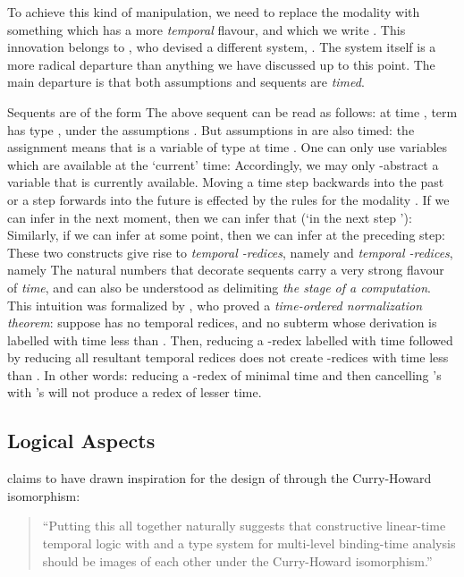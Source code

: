 \documentclass[a4paper]{amsart}
\begin{document}
To achieve this kind of manipulation, we need to replace the
 modality with something which has a more \emph{temporal}
flavour, and which we write . This innovation belongs to
\cite{Davies1995, Davies1996a}, who devised a different system,
. The system itself is a more radical departure
than anything we have discussed up to this point. The main
departure is that both assumptions and sequents are \emph{timed}.

Sequents are of the form  The above
sequent can be read as follows: at time , term 
has type , under the assumptions . But assumptions in
 are also timed: the assignment  means that 
is a variable of type  at time . One can only use variables
which are available at the `current' time:  Accordingly, we may only -abstract a variable that is
currently available. Moving a time step backwards into the past or
a step forwards into the future is effected by the rules for the
modality . If we can infer  in the next moment, then
we can infer that  (`in the next step '):  Similarly, if we can infer  at some point, then we can infer
 at the preceding step:  These two constructs give rise to \emph{temporal -redices},
namely  and \emph{temporal -redices}, namely  The natural numbers that decorate sequents carry a very strong
flavour of \emph{time}, and can also be understood as delimiting
\emph{the stage of a computation}. This intuition was formalized
by \cite{Davies1996a}, who proved a \emph{time-ordered
normalization theorem}: suppose  has no
temporal redices, and no subterm whose derivation is labelled with
time less than . Then, reducing a -redex labelled with
time  followed by reducing all resultant temporal redices does
not create -redices with time less than . In other
words: reducing a -redex of minimal time and then
cancelling 's with 's will not
produce a redex of lesser time.

\subsection{Logical Aspects}

\cite{Davies1995, Davies1996a} claims to have drawn inspiration for
the design of  through the Curry-Howard
isomorphism: \begin{quote}
  ``Putting this all together naturally suggests that constructive
  linear-time temporal logic with  and a type system for
  multi-level binding-time analysis should be images of each other
  under the Curry-Howard isomorphism.''
\end{quote}
\end{document}
